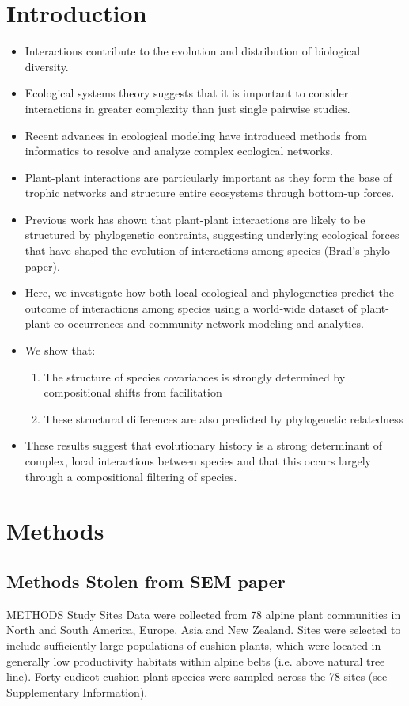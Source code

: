 \documentclass[12pt]{article}
\begin{document}
\section{Introduction}
\begin{itemize}
\item Interactions contribute to the evolution and distribution of
  biological diversity.
\item Ecological systems theory suggests that it is important to
  consider interactions in greater complexity than just single
  pairwise studies.
\item Recent advances in ecological modeling have introduced methods
  from informatics to resolve and analyze complex ecological networks.
\item Plant-plant interactions are particularly important as they form
  the base of trophic networks and structure entire ecosystems through
  bottom-up forces.
\item Previous work has shown that plant-plant interactions are likely
  to be structured by phylogenetic contraints, suggesting underlying
  ecological forces that have shaped the evolution of interactions
  among species (Brad's phylo paper).
\item Here, we investigate how both local ecological and phylogenetics
  predict the outcome of interactions among species using a world-wide
  dataset of plant-plant co-occurrences and community network modeling
  and analytics.
\item We show that:
  \begin{enumerate}
  \item The structure of species covariances is strongly determined by
    compositional shifts from facilitation
  \item These structural differences are also predicted by
    phylogenetic relatedness 
  \end{enumerate}
\item These results suggest that evolutionary history is a strong
  determinant of complex, local interactions between species and that
  this occurs largely through a compositional filtering of species.
\end{itemize}

\section{Methods}

\subsection{Methods Stolen from SEM paper}
METHODS
Study Sites 
Data were collected from 78 alpine plant communities in North and
South America, Europe, Asia and New Zealand. Sites were selected to
include sufficiently large populations of cushion plants, which were
located in generally low productivity habitats within alpine belts
(i.e. above natural tree line). Forty eudicot cushion plant species
were sampled across the 78 sites (see Supplementary Information).
\end{document}
